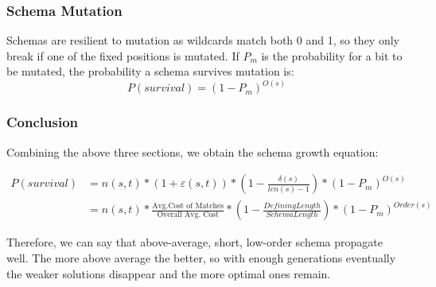 \subsubsection{Schema Mutation}
Schemas are resilient to mutation as wildcards match both 0 and 1, so they only break if one of the fixed positions is mutated. If $P_m$ is the probability for a bit to be mutated, the probability a schema survives mutation is:
\begin{equation}
    P(survival) = (1 - P_m)^{O(s)}
\end{equation}

\subsubsection{Conclusion}
Combining the above three sections, we obtain the schema growth equation:

\begin{align}
    P(survival) &= n(s,t) * (1 + \varepsilon(s,t)) * \left(1- \frac{\delta(s)}{len(s)-1} \right) * (1 - P_m)^{O(s)} \\
    &= n(s,t) * \frac{\text{Avg.Cost of Matches}}{\text{Overall Avg. Cost}} * (1- \frac{Defining Length}{Schema Length}) * (1- P_m) ^ {Order(s)}
\end{align}

Therefore, we can say that above-average, short, low-order schema propagate well. The more above average the better, so with enough generations eventually the weaker solutions disappear and the more optimal ones remain. 